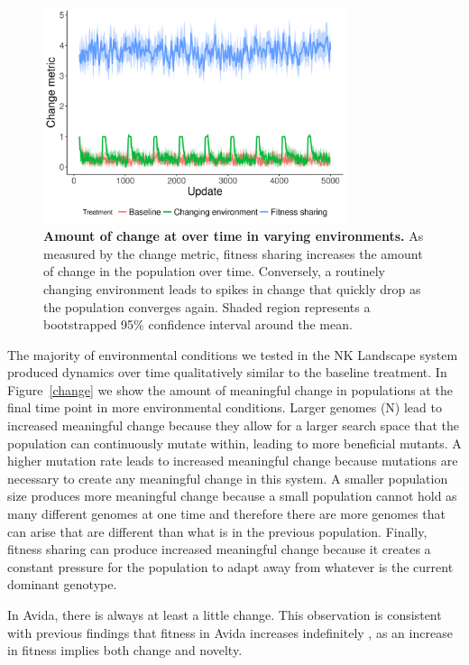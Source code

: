 \documentclass[letterpaper]{article}
\begin{document}
\begin{figure}
\includegraphics[width=3.5in]{figs/change_changing_environments.png}
\caption{\textbf{Amount of change at over time in varying environments.} As measured by the change metric, fitness sharing increases the amount of change in the population over time. Conversely, a routinely changing environment leads to spikes in change that quickly drop as the population converges again. Shaded region represents a bootstrapped 95\% confidence interval around the mean.}
\label{change_time}
\end{figure}

The majority of environmental conditions we tested in the NK Landscape system produced dynamics over time qualitatively similar to the baseline treatment. In Figure~\ref{change} we show the amount of meaningful change in populations at the final time point in more environmental conditions. Larger genomes (N) lead to increased meaningful change because they allow for a larger search space that the population can continuously mutate within, leading to more beneficial mutants. A higher mutation rate leads to increased meaningful change because mutations are necessary to create any meaningful change in this system. A smaller population size produces more meaningful change because a small population cannot hold as many different genomes at one time and therefore there are more genomes that can arise that are different than what is in the previous population. Finally, fitness sharing can produce increased meaningful change because it creates a constant pressure for the population to adapt away from whatever is the current dominant genotype.

In Avida, there is always at least a little change. This observation is consistent with previous findings that fitness in Avida increases indefinitely \citep{wiser_analysis_2015}, as an increase in fitness implies both change and novelty.   
\end{document}
